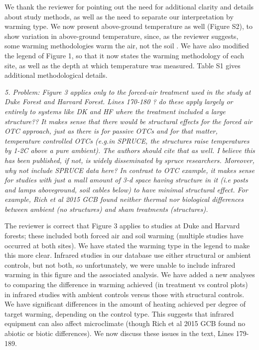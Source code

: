 \documentclass[11pt,a4paper]{letter}
\begin{document}
\begin{letter}{}
\par We thank the reviewer for pointing out the need for additional clarity and details about study methods, as well as the need to separate our interpretation by warming type. We now present above-ground temperature as well (Figure S2), to show variation in above-ground temperature, since, as the reviewer suggests, some warming methodologies warm the air, not the soil . We have also modified the legend of Figure 1, so that it now states the warming methodology of each site, as well as the depth at which temperature was measured. Table S1 gives additional methodological details.
\\

\par \emph{5. Problem: Figure 3 applies only to the forced-air treatment used in the study at Duke Forest and Harvard Forest. Lines 170-180 ? do these apply largely or entirely to systems like DK and HF where the treatment included a large structure?? It makes sense that there would be structural effects for the forced air OTC approach, just as there is for passive OTCs and for that matter, temperature controlled OTCs (e.g.in SPRUCE, the structures raise temperatures by 1-2C above a pure ambient). The authors should cite that as well. I believe this has been published, if not, is widely disseminated by spruce researchers. Moreover, why not include SPRUCE data here? In contrast to OTC example, it makes sense for studies with just a  mall amount of 3-d space having structure in it (i.e posts and lamps aboveground, soil cables below) to have minimal structural effect. For example, Rich et al 2015 GCB found neither thermal nor biological differences between ambient (no structures) and sham treatments (structures).}
\par The reviewer is correct that Figure 3 applies to studies at Duke and Harvard forests; these included both forced air and soil warming (multiple studies have occurred at both sites). We have stated the warming type in the legend to make this more clear. Infrared studies in our database use either structural or ambient controls, but not both, so unfortunately, we were unable to include infrared warming in this figure and the associated analysis. We have added a new analyses to comparing the difference in warming achieved (in treatment vs control plots) in infrared studies with ambient controls versus those with structural controls. We have significant differences in the amount of heating achieved per degree of target warming, depending on the control type. This suggests that infrared equipment can also affect microclimate (though  Rich et al 2015 GCB found no abiotic or biotic differences). We now discuss these issues in the text, Lines 179-189. 

\end{letter}
\end{document}
